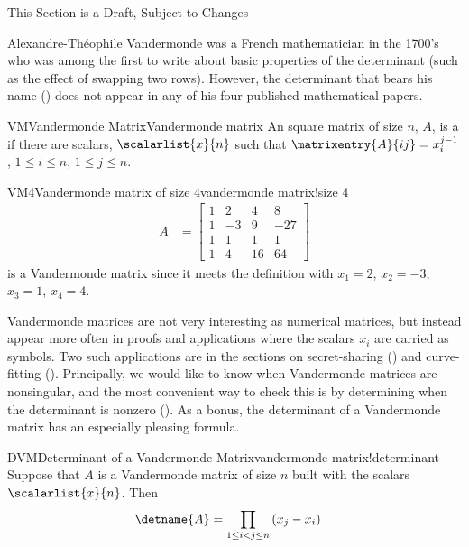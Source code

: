 %
{\sc\large This Section is a Draft, Subject to Changes}\par\bigskip
%
Alexandre-Th\'{e}ophile Vandermonde was a French mathematician in the 1700's who was among the first to write about basic properties of the determinant (such as the effect of swapping two rows).  However, the determinant that bears his name () does not appear in any of his four published mathematical papers.
%
\begin{definition}{VM}{Vandermonde Matrix}{Vandermonde matrix}
An square matrix of size $n$, $A$, is a  if there are scalars, $\scalarlist{x}{n}$ such that $\matrixentry{A}{ij}=x_{i}^{j-1}$, $1\leq i\leq n$, $1\leq j\leq n$.
\end{definition}
%
%
\begin{example}{VM4}{Vandermonde matrix of size 4}{vandermonde matrix!size 4}
%
\begin{align*}
A&=
\begin{bmatrix}
1 & 2 & 4 & 8\\
1 & -3 & 9 & -27\\
1 & 1 & 1 & 1\\
1 & 4 & 16 & 64
\end{bmatrix}
\end{align*}
%
is a Vandermonde matrix since it meets the definition with $x_1=2$, $x_2=-3$, $x_3=1$, $x_4=4$.
\end{example}
%
Vandermonde matrices are not very interesting as numerical matrices, but instead appear more often in proofs and applications where the scalars $x_i$ are carried as symbols.  Two such applications are in the sections on secret-sharing () and curve-fitting ().  Principally, we would like to know when Vandermonde matrices are nonsingular, and the most convenient way to check this is by determining when the determinant is nonzero ().  As a bonus, the determinant of a Vandermonde matrix has an especially pleasing formula.
%
\begin{theorem}{DVM}{Determinant of a Vandermonde Matrix}{vandermonde matrix!determinant}
Suppose that $A$ is a Vandermonde matrix of size $n$ built with the scalars $\scalarlist{x}{n}$.  Then
%
\begin{align*}
\detname{A}
&=\prod_{1\leq i<j\leq n}\left(x_j-x_i\right)
\end{align*}
%
\end{theorem}
